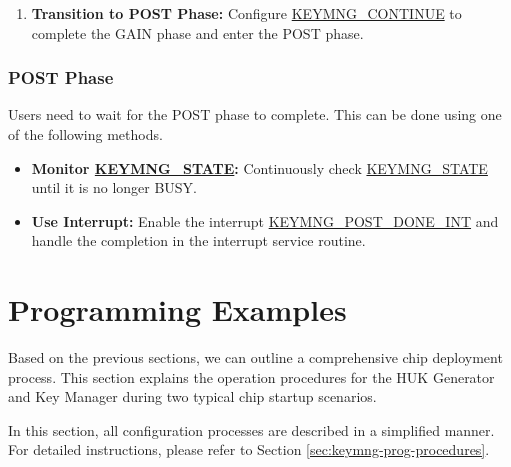 \documentclass[main\_\_EN.tex]{subfiles}
\begin{document}
\begin{enumerate}
\begin{itemize}
\begin{enumerate}
        \end{enumerate}
        \item \textbf{Private Key Recovery Mode:} no need to read any information.
        \item \textbf{\hyperref[para:keyinfo]{\begin{math}key\_info\end{math}} Export Mode:}
        \begin{enumerate}
            \item Read \hyperref[para:keyinfo]{\begin{math}key\_info\end{math}} (512 bits) from \hyperref[mem:keymng-public-info]{KEYMNG\_PUBLIC\_INFO\_MEM}.
        \end{enumerate}
    \end{itemize}
    \item \textbf{Transition to POST Phase:} Configure \hyperref[fielddesc:KEYMNGCONTINUE]{KEYMNG\_CONTINUE} to complete the GAIN phase and enter the POST phase.
\end{enumerate}


\subsubsection{POST Phase}
Users need to wait for the POST phase to complete. This can be done using one of the following methods.
\begin{itemize}
    \item \textbf{Monitor \hyperref[fielddesc:KEYMNGSTATE]{KEYMNG\_STATE}:} Continuously check \hyperref[fielddesc:KEYMNGSTATE]{KEYMNG\_STATE} until it is no longer BUSY.
    \item \textbf{Use Interrupt:} Enable the interrupt \hyperref[int:KEYMNGPOSTDONEINT]{KEYMNG\_POST\_DONE\_INT} and handle the completion in the interrupt service routine. 
\end{itemize}



\section{Programming Examples}

Based on the previous sections, we can outline a comprehensive chip deployment process. This section explains the operation procedures for the HUK Generator and Key Manager during two typical chip startup scenarios.


\vspace{-0.5em}
\begin{tiplisting}
In this section, all configuration processes are described in a simplified manner. For detailed instructions, please refer to Section \ref{sec:keymng-prog-procedures}.
\end{tiplisting}
\end{document}
